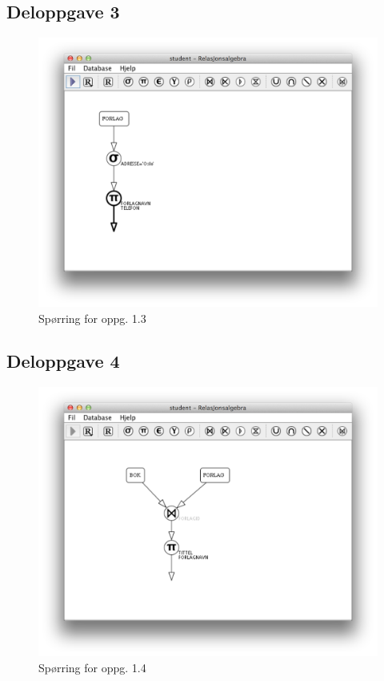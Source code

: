 \documentclass[a4paper, 12pt] {article}
\begin{document}
\subsection{Deloppgave 3}
\begin{figure}[h!]
    \includegraphics[width=\linewidth]{img/1-3.png}
    \caption{Spørring for oppg. 1.3 \label{img:1.3}}
\end{figure}
\newpage

\subsection{Deloppgave 4}
\begin{figure}[h!]
    \includegraphics[width=\linewidth]{img/1-4.png}
    \caption{Spørring for oppg. 1.4 \label{img:1.4}}
\end{figure}
\newpage
\end{document}

